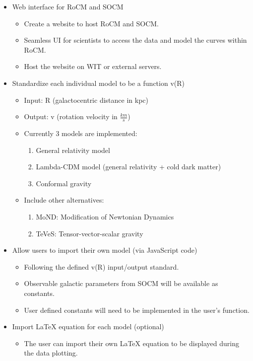 \documentclass{article}
\begin{document}
\begin{itemize}
	\item Web interface for RoCM and SOCM
	\begin{itemize}
		\item Create a website to host RoCM and SOCM. 
		\item Seamless UI for scientists to access the data and model the curves within RoCM.
		\item Host the website on WIT or external servers.
	\end{itemize}
	\item Standardize each individual model to be a function v(R)
	\begin{itemize}
		\item Input: R (galactocentric distance in kpc)
		\item Output: v (rotation velocity in $\frac{km}{s}$)
		\item Currently 3 models are implemented:
		\begin{enumerate}
			\item General relativity model
			\item Lambda-CDM model (general relativity + cold dark matter)
			\item Conformal gravity
		\end{enumerate}
		\item Include other alternatives:
		\begin{enumerate}
			\item MoND: Modification of Newtonian Dynamics
			\item TeVeS: Tensor-vector-scalar gravity
		\end{enumerate}
	\end{itemize}
	\item Allow users to import their own model (via JavaScript code)
	\begin{itemize}
		\item Following the defined v(R) input/output standard.
		\item Observable galactic parameters from SOCM will be available as constants.
		\item User defined constants will need to be implemented in the user's function.
	\end{itemize}
	\item Import LaTeX equation for each model (optional)
	\begin{itemize}
		\item The user can import their own LaTeX equation to be displayed during the data plotting.

\end{itemize}
\end{itemize}
\end{document}
